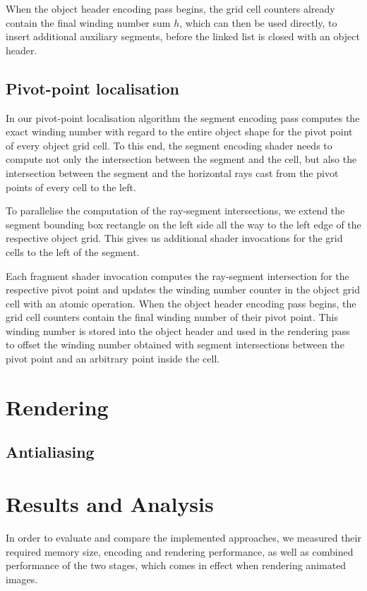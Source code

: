 \documentclass[11pt,a4paper,twoside]{article}
\begin{document}
When the object header encoding pass begins, the grid cell counters already contain the final winding number sum $h$, which can then be used directly, to insert additional auxiliary segments, before the linked list is closed with an object header.

\subsection {Pivot-point localisation}

In our pivot-point localisation algorithm the segment encoding pass computes the exact winding number with regard to the entire object shape for the pivot point of every object grid cell. To this end, the segment encoding shader needs to compute not only the intersection between the segment and the cell, but also the intersection between the segment and the horizontal rays cast from the pivot points of every cell to the left.

To parallelise the computation of the ray-segment intersections, we extend the segment bounding box rectangle on the left side all the way to the left edge of the respective object grid. This gives us additional shader invocations for the grid cells to the left of the segment.

Each fragment shader invocation computes the ray-segment intersection for the respective pivot point and updates the winding number counter in the object grid cell with an atomic operation. When the object header encoding pass begins, the grid cell counters contain the final winding number of their pivot point. This winding number is stored into the object header and used in the rendering pass to offset the winding number obtained with segment intersections between the pivot point and an arbitrary point inside the cell.

\newpage
\section {Rendering}
\subsection{Antialiasing}

\newpage
\section {Results and Analysis}

In order to evaluate and compare the implemented approaches, we measured their required memory size, encoding and rendering performance, as well as combined performance of the two stages, which comes in effect when rendering animated images.
\end{document}
